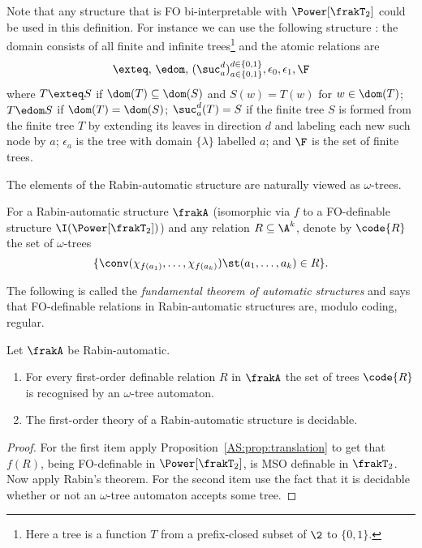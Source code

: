 Note that any structure that is FO bi-interpretable with $\Power[\frakT_2]$ could be used in this definition. For instance we can use the following structure \cite{Blum99}:
the domain consists of all finite and infinite trees\footnote{Here a tree is a function $T$ from a prefix-closed subset of $\2$ to $\{0,1\}$.}  and the atomic relations are
 \[
       \exteq, \, \edom,\,  (\suc_a^d)_{a \in \{0,1\}}^{d \in \{0,1\}},  \epsilon_0, \epsilon_1, \F 
 \]
where  $T \exteq S$ if $\dom(T) \subseteq \dom(S)$
and $S(w) = T(w)$ for $w \in \dom(T)$; $T \edom S$ if $\dom(T) = \dom(S)$;  $\suc_a^d(T) = S$ if the finite tree $S$ is formed from the finite tree $T$ by extending its leaves in direction $d$
and labeling each new such node by $a$; $\epsilon_a$ is the tree with domain $\{\lambda\}$ labelled $a$; and $\F$ is the set of finite trees.

The elements of the Rabin-automatic structure are naturally viewed as $\omega$-trees. 

\begin{definition}
For a Rabin-automatic structure $\frakA$ (isomorphic via $f$ to a FO-definable structure $\I(\Power[\frakT_2])$) and any relation $R \subseteq \A^k$, denote by
$\code{R}$ the set of $\omega$-trees 
\[\{\conv(\chi_{f(a_1)},\dots,\chi_{f(a_k)}) \st  (a_1,\dots,a_k) \in R\}.\]
\end{definition}

The following is called the {\em fundamental theorem of automatic structures} and says that FO-definable relations in Rabin-automatic structures are, modulo coding, regular. 

\begin{theorem} \label{AS:thm:fundthm} 
Let $\frakA$ be Rabin-automatic.
\begin{enumerate}
\item For every first-order definable relation $R$ in $\frakA$ the set of trees $\code{R}$ is recognised by an $\omega$-tree automaton.
\item The first-order theory of a Rabin-automatic structure is decidable.
\end{enumerate}
\end{theorem}

\begin{proof}
For the first item apply Proposition~\ref{AS:prop:translation} to get that $f(R)$, being FO-definable in $\Power[\frakT_2]$, is 
MSO definable in $\frakT_2$. Now apply Rabin's theorem.
For the second item use the fact that it is decidable whether or not an $\omega$-tree automaton accepts some tree.
\end{proof}


